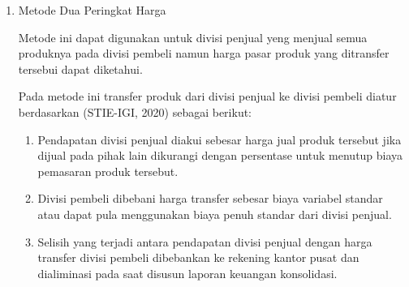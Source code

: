 \begin{enumerate}
\begin{enumerate}
		\item Metode Dua Peringkat Harga
		
		Metode ini dapat digunakan untuk divisi penjual yeng menjual semua produknya pada divisi pembeli namun harga pasar produk yang ditransfer tersebui dapat diketahui.

		Pada metode ini transfer produk dari divisi penjual ke divisi pembeli diatur berdasarkan (STIE-IGI, 2020) sebagai berikut:

		\begin{enumerate}
			\item Pendapatan divisi penjual diakui sebesar harga jual produk tersebut jika dijual pada pihak lain dikurangi dengan persentase untuk menutup biaya pemasaran produk tersebut.
			\item Divisi pembeli dibebani harga transfer sebesar biaya variabel standar atau dapat pula menggunakan biaya penuh standar dari divisi penjual.
			\item Selisih yang terjadi antara pendapatan divisi penjual dengan harga transfer divisi pembeli dibebankan ke rekening kantor pusat dan dialiminasi pada saat disusun laporan keuangan konsolidasi.
		\end{enumerate}
	\end{enumerate}
\end{enumerate}